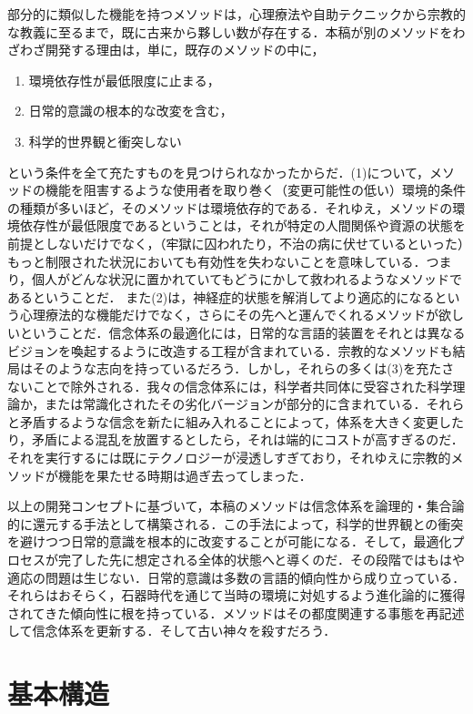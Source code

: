部分的に類似した機能を持つメソッドは，心理療法や自助テクニックから宗教的な教義に至るまで，既に古来から夥しい数が存在する．本稿が別のメソッドをわざわざ開発する理由は，単に，既存のメソッドの中に，
\begin{enumerate}[label=(\arabic*)]
    \item 環境依存性が最低限度に止まる，
    \item 日常的意識の根本的な改変を含む，
    \item 科学的世界観と衝突しない
\end{enumerate}
という条件を全て充たすものを見つけられなかったからだ．(1)について，メソッドの機能を阻害するような使用者を取り巻く（変更可能性の低い）環境的条件の種類が多いほど，そのメソッドは環境依存的である．それゆえ，メソッドの環境依存性が最低限度であるということは，それが特定の人間関係や資源の状態を前提としないだけでなく，（牢獄に囚われたり，不治の病に伏せているといった）もっと制限された状況においても有効性を失わないことを意味している．つまり，個人がどんな状況に置かれていてもどうにかして救われるようなメソッドであるということだ．
また(2)は，神経症的状態を解消してより適応的になるという心理療法的な機能だけでなく，さらにその先へと運んでくれるメソッドが欲しいということだ．信念体系の最適化には，日常的な言語的装置をそれとは異なるビジョンを喚起するように改造する工程が含まれている．宗教的なメソッドも結局はそのような志向を持っているだろう．しかし，それらの多くは(3)を充たさないことで除外される．我々の信念体系には，科学者共同体に受容された科学理論か，または常識化されたその劣化バージョンが部分的に含まれている．それらと矛盾するような信念を新たに組み入れることによって，体系を大きく変更したり，矛盾による混乱を放置するとしたら，それは端的にコストが高すぎるのだ．それを実行するには既にテクノロジーが浸透しすぎており，それゆえに宗教的メソッドが機能を果たせる時期は過ぎ去ってしまった．

以上の開発コンセプトに基づいて，本稿のメソッドは信念体系を論理的・集合論的に還元する手法として構築される．この手法によって，科学的世界観との衝突を避けつつ日常的意識を根本的に改変することが可能になる．そして，最適化プロセスが完了した先に想定される全体的状態へと導くのだ．その段階ではもはや適応の問題は生じない．日常的意識は多数の言語的傾向性から成り立っている．それらはおそらく，石器時代を通じて当時の環境に対処するよう進化論的に獲得されてきた傾向性に根を持っている．メソッドはその都度関連する事態を再記述して信念体系を更新する．そして古い神々を殺すだろう．

\section{基本構造}
\label{sec:基本構造}

